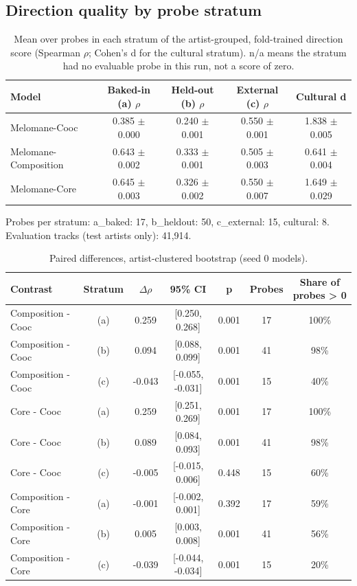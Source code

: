 \documentclass[11pt,a4paper]{article}
\begin{document}
\subsection*{Direction quality by probe stratum}
\begin{table}[h]\centering\small
\begin{tabular}{lcccc}
\toprule
\textbf{Model} & \textbf{Baked-in (a) $\rho$} & \textbf{Held-out (b) $\rho$} & \textbf{External (c) $\rho$} & \textbf{Cultural d} \\
\midrule
Melomane-Cooc & 0.385 $\pm$ 0.000 & 0.240 $\pm$ 0.001 & 0.550 $\pm$ 0.001 & 1.838 $\pm$ 0.005 \\
Melomane-Composition & 0.643 $\pm$ 0.002 & 0.333 $\pm$ 0.001 & 0.505 $\pm$ 0.003 & 0.641 $\pm$ 0.004 \\
Melomane-Core & 0.645 $\pm$ 0.003 & 0.326 $\pm$ 0.002 & 0.550 $\pm$ 0.007 & 1.649 $\pm$ 0.029 \\
\bottomrule
\end{tabular}
\caption{Mean over probes in each stratum of the artist-grouped, fold-trained direction score (Spearman $\rho$; Cohen's d for the cultural stratum). n/a means the stratum had no evaluable probe in this run, not a score of zero.}
\end{table}

Probes per stratum: a\_baked: 17, b\_heldout: 50, c\_external: 15, cultural: 8. Evaluation tracks (test artists only): 41,914.

\begin{table}[h]\centering\small
\begin{tabular}{lcccccc}
\toprule
\textbf{Contrast} & \textbf{Stratum} & \textbf{$\Delta$$\rho$} & \textbf{95\% CI} & \textbf{p} & \textbf{Probes} & \textbf{Share of probes > 0} \\
\midrule
Composition - Cooc & (a) & 0.259 & [0.250, 0.268] & 0.001 & 17 & 100\% \\
Composition - Cooc & (b) & 0.094 & [0.088, 0.099] & 0.001 & 41 & 98\% \\
Composition - Cooc & (c) & -0.043 & [-0.055, -0.031] & 0.001 & 15 & 40\% \\
Core - Cooc & (a) & 0.259 & [0.251, 0.269] & 0.001 & 17 & 100\% \\
Core - Cooc & (b) & 0.089 & [0.084, 0.093] & 0.001 & 41 & 98\% \\
Core - Cooc & (c) & -0.005 & [-0.015, 0.006] & 0.448 & 15 & 60\% \\
Composition - Core & (a) & -0.001 & [-0.002, 0.001] & 0.392 & 17 & 59\% \\
Composition - Core & (b) & 0.005 & [0.003, 0.008] & 0.001 & 41 & 56\% \\
Composition - Core & (c) & -0.039 & [-0.044, -0.034] & 0.001 & 15 & 20\% \\
\bottomrule
\end{tabular}
\caption{Paired differences, artist-clustered bootstrap (seed 0 models).}
\end{table}
\end{document}
